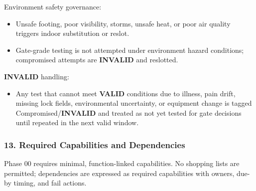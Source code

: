 \documentclass[10pt]{article}
\begin{document}
Environment safety governance:

\begin{itemize}
\item Unsafe footing, poor visibility, storms, unsafe heat, or poor air quality triggers indoor substitution or reslot.
\item Gate-grade testing is not attempted under environment hazard conditions; compromised attempts are \textbf{INVALID} and reslotted.
\end{itemize}

\textbf{INVALID} handling:

\begin{itemize}
\item Any test that cannot meet \textbf{VALID} conditions due to illness, pain drift, missing lock fields, environmental uncertainty, or equipment change is tagged Compromised/\textbf{INVALID} and treated as not yet tested for gate decisions until repeated in the next valid window.
\end{itemize}

\subsubsection*{13. Required Capabilities and Dependencies}

Phase 00 requires minimal, function-linked capabilities. No shopping lists are permitted; dependencies are expressed as required capabilities with owners, due-by timing, and fail actions.
\end{document}
